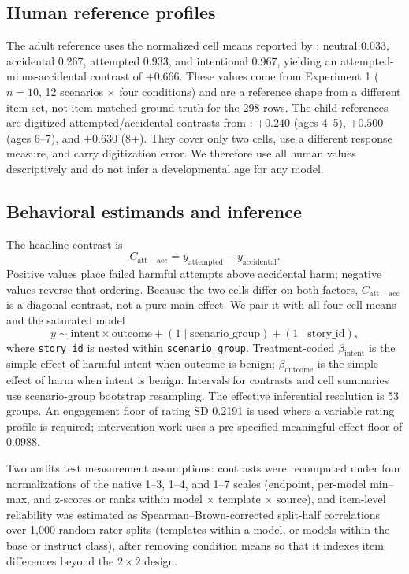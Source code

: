 \documentclass[11pt]{article}
\newcommand{\contrast}{C_{\mathrm{att-acc}}}
\newcommand{\intentbeta}{\beta_{\mathrm{intent}}}
\newcommand{\outcomebeta}{\beta_{\mathrm{outcome}}}
\begin{document}
\subsection{Human reference profiles}

The adult reference uses the normalized cell means reported by \citet{young2007neural}: neutral 0.033, accidental 0.267, attempted 0.933, and intentional 0.967, yielding an attempted-minus-accidental contrast of $+0.666$.
These values come from Experiment 1 ($n=10$, 12 scenarios $\times$ four conditions) and are a reference shape from a different item set, not item-matched ground truth for the 298 rows.
The child references are digitized attempted/accidental contrasts from \citet{cushman2013development}: $+0.240$ (ages 4--5), $+0.500$ (ages 6--7), and $+0.630$ (8+).
They cover only two cells, use a different response measure, and carry digitization error.
We therefore use all human values descriptively and do not infer a developmental age for any model.

\subsection{Behavioral estimands and inference}

The headline contrast is
\begin{equation}
    \contrast = \bar{y}_{\mathrm{attempted}}-\bar{y}_{\mathrm{accidental}}.
\end{equation}
Positive values place failed harmful attempts above accidental harm; negative values reverse that ordering.
Because the two cells differ on both factors, $\contrast$ is a diagonal contrast, not a pure main effect.
We pair it with all four cell means and the saturated model
\begin{equation}
    y \sim \mathrm{intent}\times\mathrm{outcome}
      +(1\mid\mathrm{scenario\_group})+(1\mid\mathrm{story\_id}),
\end{equation}
where \texttt{story\_id} is nested within \texttt{scenario\_group}.
Treatment-coded $\intentbeta$ is the simple effect of harmful intent when outcome is benign; $\outcomebeta$ is the simple effect of harm when intent is benign.
Intervals for contrasts and cell summaries use scenario-group bootstrap resampling.
The effective inferential resolution is 53 groups.
An engagement floor of rating SD 0.2191 is used where a variable rating profile is required; intervention work uses a pre-specified meaningful-effect floor of 0.0988.

Two audits test measurement assumptions: contrasts were recomputed under four normalizations of the native 1--3, 1--4, and 1--7 scales (endpoint, per-model min--max, and z-scores or ranks within model $\times$ template $\times$ source), and item-level reliability was estimated as Spearman--Brown-corrected split-half correlations over 1{,}000 random rater splits (templates within a model, or models within the base or instruct class), after removing condition means so that it indexes item differences beyond the $2\times2$ design.
\end{document}
